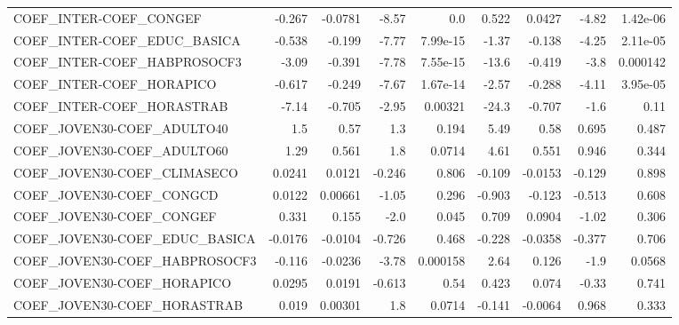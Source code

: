 \begin{tabular}{lrrrrrrrr}
COEF\_INTER-COEF\_CONGEF            &      -0.267 &      -0.0781 &   -8.57 &      0.0 &      0.522 &      0.0427 &        -4.82 &      1.42e-06 \\
COEF\_INTER-COEF\_EDUC\_BASICA       &      -0.538 &       -0.199 &   -7.77 & 7.99e-15 &      -1.37 &      -0.138 &        -4.25 &      2.11e-05 \\
COEF\_INTER-COEF\_HABPROSOCF3       &       -3.09 &       -0.391 &   -7.78 & 7.55e-15 &      -13.6 &      -0.419 &         -3.8 &      0.000142 \\
COEF\_INTER-COEF\_HORAPICO          &      -0.617 &       -0.249 &   -7.67 & 1.67e-14 &      -2.57 &      -0.288 &        -4.11 &      3.95e-05 \\
COEF\_INTER-COEF\_HORASTRAB         &       -7.14 &       -0.705 &   -2.95 &  0.00321 &      -24.3 &      -0.707 &         -1.6 &          0.11 \\
COEF\_JOVEN30-COEF\_ADULTO40        &         1.5 &         0.57 &     1.3 &    0.194 &       5.49 &        0.58 &        0.695 &         0.487 \\
COEF\_JOVEN30-COEF\_ADULTO60        &        1.29 &        0.561 &     1.8 &   0.0714 &       4.61 &       0.551 &        0.946 &         0.344 \\
COEF\_JOVEN30-COEF\_CLIMASECO       &      0.0241 &       0.0121 &  -0.246 &    0.806 &     -0.109 &     -0.0153 &       -0.129 &         0.898 \\
COEF\_JOVEN30-COEF\_CONGCD          &      0.0122 &      0.00661 &   -1.05 &    0.296 &     -0.903 &      -0.123 &       -0.513 &         0.608 \\
COEF\_JOVEN30-COEF\_CONGEF          &       0.331 &        0.155 &    -2.0 &    0.045 &      0.709 &      0.0904 &        -1.02 &         0.306 \\
COEF\_JOVEN30-COEF\_EDUC\_BASICA     &     -0.0176 &      -0.0104 &  -0.726 &    0.468 &     -0.228 &     -0.0358 &       -0.377 &         0.706 \\
COEF\_JOVEN30-COEF\_HABPROSOCF3     &      -0.116 &      -0.0236 &   -3.78 & 0.000158 &       2.64 &       0.126 &         -1.9 &        0.0568 \\
COEF\_JOVEN30-COEF\_HORAPICO        &      0.0295 &       0.0191 &  -0.613 &     0.54 &      0.423 &       0.074 &        -0.33 &         0.741 \\
COEF\_JOVEN30-COEF\_HORASTRAB       &       0.019 &      0.00301 &     1.8 &   0.0714 &     -0.141 &     -0.0064 &        0.968 &         0.333 \\

\end{tabular}
